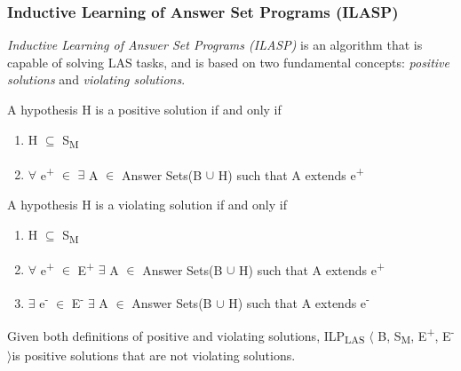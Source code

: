 \documentclass[12pt,twoside]{report}
\theoremstyle{plain}
\theoremstyle{definition}
\newtheorem{examp}{example}[section]
\begin{document}

%
%


\subsubsection{Inductive Learning of Answer Set Programs (ILASP)}

\textit{Inductive Learning of Answer Set Programs (ILASP)} is an algorithm that is capable of solving LAS tasks, and is based on two fundamental concepts: \textit{positive solutions} and \textit{violating solutions}.

A hypothesis H is a positive solution if and only if
\begin{enumerate}
\item H $\subseteq$ S\textsubscript{M}
\item $\forall$ e\textsuperscript{+} $\in$ $\exists$ A $\in$ Answer Sets(B $\cup$ H) such that A extends e\textsuperscript{+}
\end{enumerate}
A hypothesis H is a violating solution if and only if
\begin{enumerate}
\item H $\subseteq$ S\textsubscript{M}
\item $\forall$ e\textsuperscript{+} $\in$ E\textsuperscript{+} $\exists$ A $\in$ Answer Sets(B $\cup$ H) such that A extends e\textsuperscript{+}
\item $\exists$ e\textsuperscript{-} $\in$ E\textsuperscript{-} $\exists$ A $\in$ Answer Sets(B $\cup$ H) such that A extends e\textsuperscript{-}\\
\end{enumerate}

Given both definitions of positive and violating solutions, ILP\textsubscript{LAS} $\langle$ B, S\textsubscript{M}, E\textsuperscript{+}, E\textsuperscript{-} $\rangle$is positive solutions that are not violating solutions.
\end{document}

